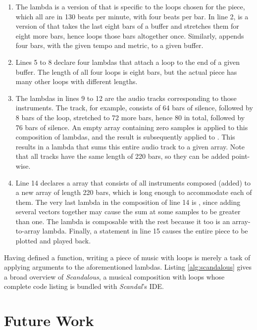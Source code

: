 \begin{enumerate}
	\item The  lambda is a version of  that is specific to the loops chosen for the piece, which all are in 130 beats per minute, with four beats per bar. In line 2,  is a version of  that takes the last eight bars of a buffer and stretches them for eight more bars, hence loops those bars altogether once. Similarly,  appends four bars, with the given tempo and metric, to a given buffer.
	\addtocounter{enumi}{3}
	\item Lines 5 to 8 declare four lambdas that attach a loop to the end of a given buffer. The length of all four loops is eight bars, but the actual piece has many other loops with different lengths.
	\addtocounter{enumi}{3}
	\item The lambdas in lines 9 to 12 are the audio tracks corresponding to those instruments. The  track, for example, consists of 64 bars of silence, followed by 8 bars of the  loop, stretched to 72 more bars, hence 80 in total, followed by 76 bars of silence. An empty array containing zero samples is applied to this composition of lambdas, and the result is subsequently applied to . This results in a lambda that sums this entire audio track to a given array. Note that all tracks have the same length of 220 bars, so they can be added point-wise.
	\addtocounter{enumi}{4}
	\item Line 14 declares a  array that consists of all instruments composed (added) to a new array of length 220 bars, which is long enough to accommodate each of them. The very last lambda in the composition of line 14 is , since adding several vectors together may cause the sum at some samples to be greater than one. The  lambda is composable with the rest because it too is an array-to-array lambda. Finally, a  statement in line 15 causes the entire piece to be plotted and played back.
\end{enumerate}

Having defined a  function, writing a piece of music with loops is merely a task of applying arguments to the aforementioned lambdas. Listing \ref{alg:scandalous} gives a broad overview of \emph{Scandalous}, a musical composition with loops whose complete code listing is bundled with \emph{Scandal}'s IDE.

\section{Future Work}

